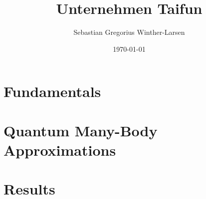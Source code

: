 \documentclass[twoside, english, notitlepage, 10pt]{uiofysmaster}
\author{Sebastian Gregorius Winther-Larsen}
\title{Unternehmen Taifun}
\date{\today}
\begin{document}
\frontmatter
    \maketitle

    \setcounter{tocdepth}{1}
    \tableofcontents

\mainmatter

    \part{Fundamentals}

        
        

    \part{Quantum Many-Body Approximations}

        
        
        

    \part{Results}

        

    \appendix

        
        
        
\printbibliography
\end{document}
